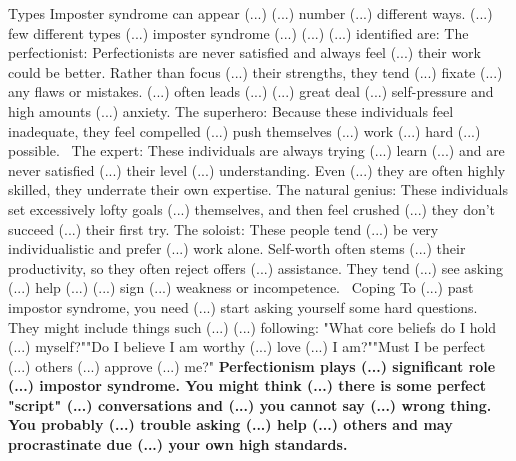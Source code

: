 \documentclass[14pt,a4paper]{extarticle}
\begin{document}
\newline\newline  Types \newline\newline 
Imposter syndrome can appear (...) (...) number (...) different ways. (...) few different types (...) imposter syndrome (...) (...) (...) identified are:﻿﻿
\newline\newline 
The perfectionist: Perfectionists are never satisfied and always feel (...) their work could be better. Rather than focus (...) their strengths, they tend (...) fixate (...) any flaws or mistakes. (...) often leads (...) (...) great deal (...) self-pressure and high amounts (...) anxiety.
The superhero: Because these individuals feel inadequate, they feel compelled (...) push themselves (...) work (...) hard (...) possible. 
The expert: These individuals are always trying (...) learn (...) and are never satisfied (...) their level (...) understanding. Even (...) they are often highly skilled, they underrate their own expertise.
The natural genius: These individuals set excessively lofty goals (...) themselves, and then feel crushed (...) they don't succeed (...) their first try.
The soloist: These people tend (...) be very individualistic and prefer (...) work alone. Self-worth often stems (...) their productivity, so they often reject offers (...) assistance. They tend (...) see asking (...) help (...) (...) sign (...) weakness or incompetence. 
\newline\newline  Coping \newline\newline 
To (...) past impostor syndrome, you need (...) start asking yourself some hard questions. They might include things such (...) (...) following:
\newline\newline 
"What core beliefs do I hold (...) myself?""Do I believe I am worthy (...) love (...) I am?""Must I be perfect (...) others (...) approve (...) me?"
\newline\newline \textbf{
Perfectionism plays (...) significant role (...) impostor syndrome. You might think (...) there is some perfect "script" (...) conversations and (...) you cannot say (...) wrong thing. You probably (...) trouble asking (...) help (...) others and may procrastinate due (...) your own high standards.}\newline\newline 
\end{document}
